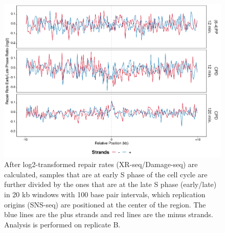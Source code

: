 \begin{figure}[H]
\begin{center}
\includegraphics[width=\textwidth]{Chapters/7_appendix/figures/supfig57}
\caption[Repair rate early/late ratio of replication origins in 20 kb (replicate B).]{After log2-transformed repair rates (XR-seq/Damage-seq) are calculated, samples that are at early S phase of the cell cycle are further divided by the ones that are at the late S phase (early/late) in 20 kb windows with 100 base pair intervals, which replication origins (SNS-seq) are positioned at the center of the region. The blue lines are the plus strands and red lines are the minus strands. Analysis is performed on replicate B.}
\label{supfig:rrel20snsB}
\end{center}
\end{figure}

